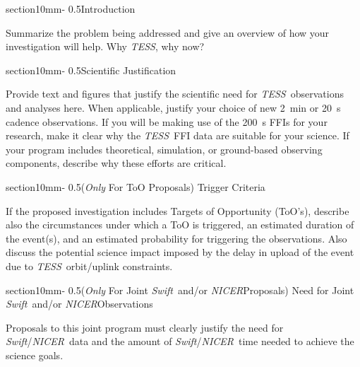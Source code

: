\documentclass[letterpaper,12pt]{article}
\makeatletter
\renewcommand{\section}{\@startsection%
{section}{1}{0mm}{-\baselineskip}%
{0.5\baselineskip}{\normalfont\Large\bfseries}}%
\newcommand{\tess}{{\it TESS}}
\newcommand{\swift}{{\it Swift}}
\newcommand{\nicer}{{\it NICER}}
\makeatother
\begin{document}
\section{Introduction}

Summarize the problem being addressed and give an overview of how your investigation will help. 
Why \tess, why now?

\section{Scientific Justification}

Provide text and figures that justify the scientific need for \tess\ observations and analyses here. When applicable, justify your choice of new 2~min or 20~s cadence observations. 
If you will be making use of the 200~s FFIs for your research, make it clear why the \tess\ FFI data are suitable for your science.
If your program includes theoretical, simulation, or ground-based observing components, describe why these efforts are critical.


\section{({\it Only} For ToO Proposals) Trigger Criteria}

If the proposed investigation includes Targets of Opportunity (ToO's), describe also the circumstances 
under which a ToO is triggered, an estimated duration of the event(s), and an estimated probability for 
triggering the observations. Also discuss the potential science impact imposed by the delay in upload 
of the event due to \tess\ orbit/uplink constraints.


\section{({\it Only} For Joint \swift\ and/or  \nicer Proposals) Need for Joint \swift\ and/or \nicer Observations}

Proposals to this joint program must clearly justify the need for \swift/\nicer ~data and the amount of \swift/\nicer ~time needed to achieve the science goals.\\
\end{document}
